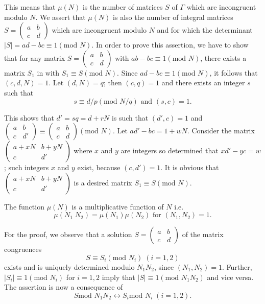 This means that $\mu(N)$ is the number of matrices $S$ of $\Gamma$
which are incongruent modulo $N$. We assert that
$\mu(N)$ is also the number of integral matrices
$S=\left(\begin{smallmatrix} a&b\\c&d \end{smallmatrix}\right)$ which
are incongruent modulo $N$ and for which the determinant
$|S|=ad-bc\equiv 1(\text{mod  }N)$. In order to prove this assertion, 
\pageoriginale we have to show that for any matrix
$S=\left(\begin{smallmatrix}  a&b\\c&d\end{smallmatrix}\right)$ with
  $ab-bc \equiv 1(\text{mod } N)$, there exists a matrix $S_1$ in with
  $S_1\equiv S(\text{mod } N)$. Since $ad-bc \equiv 1(\text{mod } N)$,
  it follows that $(c,d,N)=1$. Let $(d, N)=q$; then $(c,q)=1$ and
  there exists an integer $s$ such that    
$$
s \equiv d/p (\text{mod } N/q) \text{ and } (s,c) = 1.
$$

This shows that $d'=sq=d+rN$ is such that $(d',c)=1$ and
$\left(\begin{smallmatrix} a&b\\c&d'  \end{smallmatrix}\right) \equiv
\left(\begin{smallmatrix}  a&b\\c&d\end{smallmatrix}\right) (\text{mod }
  N)$. Let $ad'-bc=1+wN$. Consider the matrix
  $\left(\begin{smallmatrix} a+xN & b+yN\\c &
    d' \end{smallmatrix}\right) $ where $x$ and $y$ are integers so
  determined that $xd'-yc=w$; such integers $x$
  and $y$ exist, because $(c,d')=1$. It is obvious that
  $\left(\begin{smallmatrix}a+xN&b+yN\\c&d' \end{smallmatrix}\right)$
  is a desired matrix $S_1\equiv S (\text{mod } N)$.

The function $\mu(N)$ is a multiplicative function of $N$ i.e. 
$$
\mu(N_1 \; N_2) = \mu (N_1) \mu (N_2) \text{ for } (N_1, N_2) = 1.
$$

For the proof, we observe that a solution $S=
\left(\begin{smallmatrix}  a&b\\c&d\end{smallmatrix}\right) $ of the
  matrix congruences 
$$
S\equiv S_i (\text{mod } N_i) \; (i=1,2)
$$
exists and is uniquely determined modulo $N_1N_2$, since
$(N_1,N_2)=1$. Further, $|S_i|\equiv 1(\text{mod } N_i)$ for $i=1,2$ imply
that $|S|\equiv 1 (\text{mod } N_1N_2)$ and vice versa. The assertion is now a
consequence of 
$$
S\text{mod } N_1 N_2 \leftrightarrow S_i\text{mod } N_i \; (i=1,2).
$$

